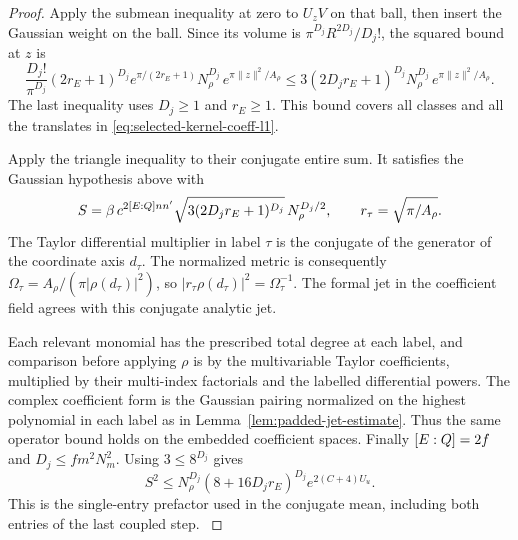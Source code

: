 \begin{proof}
Apply the submean inequality
at zero to \(U_z V\) on that ball, then insert the Gaussian
weight on the ball. Since its volume is
\(\pi^{D_j}R^{2D_j}/D_j!\), the squared bound at \(z\)
is
\[
 \frac{D_j!}{\pi^{D_j}}(2r_E+1)^{D_j}
    e^{\pi/(2r_E+1)}
    N_\rho^{D_j}\,e^{\pi\|z\|^2/A_\rho}
 \le 3(2D_jr_E+1)^{D_j}
    N_\rho^{D_j}\,e^{\pi\|z\|^2/A_\rho}.
\]
The last inequality uses \(D_j\ge1\) and \(r_E\ge1\).
This bound covers all classes and all the translates
in \eqref{eq:selected-kernel-coeff-l1}.

Apply the triangle inequality to their conjugate entire
sum. It satisfies the Gaussian hypothesis above with
\[
 S=\beta\,c^{2[E:Q]nn'}\sqrt{3(2D_jr_E+1)^{D_j}}\,
                                  N_\rho^{D_j/2},
 \qquad r_\tau=\sqrt{\pi/A_\rho}.
\]
The Taylor differential multiplier in label \(\tau\)
is the conjugate of the generator of the coordinate axis
\(d_\tau\). The normalized metric is consequently
\(\Omega_\tau=A_\rho/(\pi|\rho(d_\tau)|^2)\),
so \(|r_\tau\rho(d_\tau)|^2=\Omega_\tau^{-1}\).
The formal jet in the coefficient field agrees with
this conjugate analytic jet.

Each relevant monomial has
the prescribed total degree at each label, and comparison
before applying \(\rho\) is by the multivariable Taylor
coefficients, multiplied by their multi-index factorials
and the labelled differential powers. The complex
coefficient form is the Gaussian pairing normalized on
the highest polynomial in each label as in
Lemma~\ref{lem:padded-jet-estimate}. Thus the
same operator bound holds on the embedded coefficient
spaces. Finally \([E:Q]=2f\) and
\(D_j\le fm^2N_m^2\). Using \(3\le 8^{D_j}\) gives
\[
 S^2\le N_\rho^{D_j}(8+16D_jr_E)^{D_j}
                       e^{2(C+4)U_u}.
\]
This is the single-entry prefactor used in the conjugate
mean, including both entries of the last coupled step.
\label{cor:selected-kernel-jets-5}
\end{proof}
